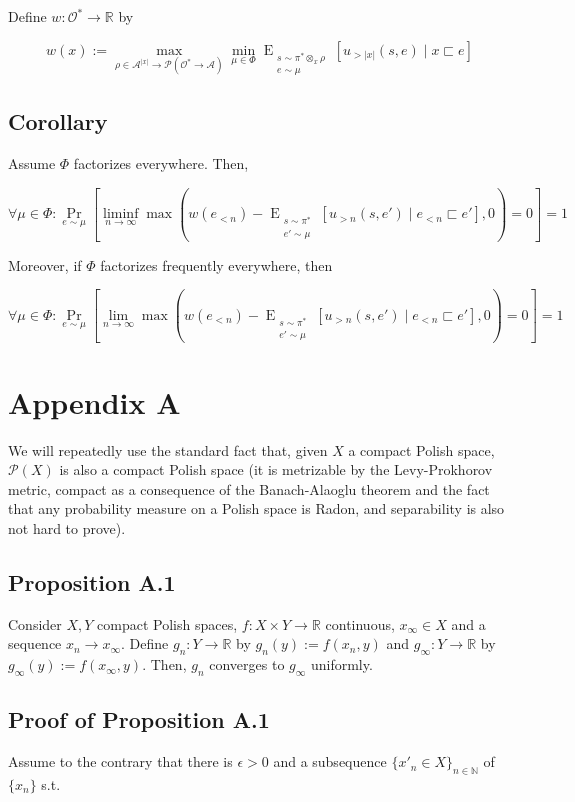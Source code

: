 \documentclass[a4paper]{article}
\DeclareMathOperator{\Prb}{Pr}
\newcommand{\EE}[2]{\operatorname{E}_{\substack{#1 \\ #2}}}
\newcommand{\Nats}{\mathbb{N}}
\newcommand{\Reals}{\mathbb{R}}
\newcommand{\Abs}[1]{\lvert #1 \rvert}
\newcommand{\Prob}{\mathcal{P}}
\newcommand{\Act}{\mathcal{A}}
\newcommand{\Obs}{\mathcal{O}}
\newcommand{\Pol}{\Obs^* \rightarrow \Act}
\begin{document}
Define ${w: \Obs^* \rightarrow \Reals}$ by

$$w(x):=\max_{\rho \in \Act^{\Abs{x}} \rightarrow \Prob(\Pol)} \min_{\mu \in \Phi} \EE{s \sim \pi^* \otimes_x \rho}{e \sim \mu}[u_{> \Abs{x}}(s,e) \mid x \sqsubset e]$$

\subsection{Corollary}

Assume ${\Phi}$ factorizes everywhere. Then,

$$\forall \mu \in \Phi: \Prb_{e \sim \mu}[\liminf_{n \rightarrow \infty} \max(w(e_{<n})-\EE{s \sim \pi^*}{e' \sim \mu}[u_{> n}(s,e') \mid e_{<n} \sqsubset e'] ,0)=0] = 1$$

Moreover, if ${\Phi}$ factorizes frequently everywhere, then

$$\forall \mu \in \Phi: \Prb_{e \sim \mu}[\lim_{n \rightarrow \infty} \max(w(e_{<n})-\EE{s \sim \pi^*}{e' \sim \mu}[u_{> n}(s,e') \mid e_{<n} \sqsubset e'] ,0)=0] = 1$$

\section{Appendix A}

We will repeatedly use the standard fact that, given ${X}$ a compact Polish space, ${\Prob(X)}$ is also a compact Polish space (it is metrizable by the Levy-Prokhorov metric, compact as a consequence of the Banach-Alaoglu theorem and the fact that any probability measure on a Polish space is Radon, and separability is also not hard to prove).

\subsection{Proposition A.1}

Consider ${X, Y}$ compact Polish spaces, ${f: X \times Y \rightarrow \Reals}$ continuous, ${x_\infty \in X}$ and a sequence ${x_n \rightarrow x_\infty}$. Define ${g_n: Y \rightarrow \Reals}$ by ${g_n(y):=f(x_n,y)}$ and ${g_\infty: Y \rightarrow \Reals}$ by ${g_\infty(y):=f(x_\infty,y)}$. Then, ${g_n}$ converges to ${g_\infty}$ uniformly.

\subsection{Proof of Proposition A.1}

Assume to the contrary that there is ${\epsilon > 0}$ and a subsequence ${\{x'_n \in X\}_{n \in \Nats}}$ of ${\{x_n\}}$ s.t. 
\end{document}
